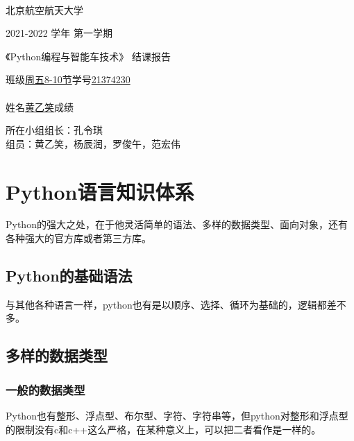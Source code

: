 \documentclass[UTF8]{ctexart}
\begin{document}
\begin{titlepage}
  \begin{center}
    \quad  \\
    {  北京航空航天大学}
  \end{center}
  \begin{center}
    {\huge 2021-2022 学年 第一学期}
    \vskip 2.5cm
  \end{center}
  \begin{center}
    {《Python编程与智能车技术》}
    \newline
    {结课报告}
    \vskip 3.5cm
  \end{center}
  \begin{center}
    { 班\quad 级\underline{周五8-10节}\qquad 学\quad 号\underline{21374230}\\}
    {\quad \\}
    {姓\quad 名\underline{\quad 黄乙笑\quad}\qquad  成\quad 绩\underline{\qquad\qquad}}
    \vskip 2.0cm
  \end{center}
  {所在小组组长：孔令琪\\}
  {组\qquad\qquad 员：黄乙笑，杨辰润，罗俊午，范宏伟}
\end{titlepage}
  \section{Python语言知识体系}
  Python的强大之处，在于他灵活简单的语法、多样的数据类型、面向对象，还有各种强大的官方库或者第三方库。
  \subsection{Python的基础语法}
  与其他各种语言一样，python也有是以顺序、选择、循环为基础的，逻辑都差不多。
  \subsection{多样的数据类型}
  \subsubsection{一般的数据类型}
  Python也有整形、浮点型、布尔型、字符、字符串等，但python对整形和浮点型的限制没有c和c++这么严格，在某种意义上，可以把二者看作是一样的。
\end{document}
